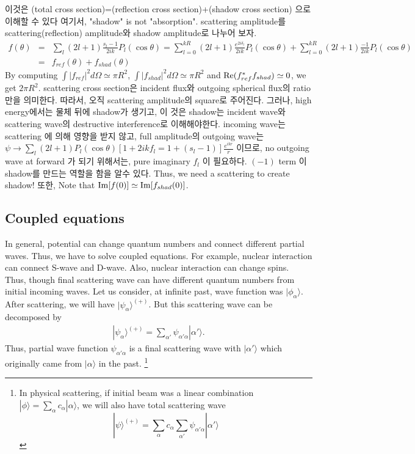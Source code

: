 \documentclass[10pt]{article}
\newcommand{\bea}{\begin{eqnarray}}
\newcommand{\eea}{\end{eqnarray}}
\newcommand{\no}{\nonumber \\}
\def\ra{\rangle}
\begin{document}
이것은 
(total cross section)=(reflection cross section)+(shadow cross section)
으로 이해할 수 있다
여기서, "shadow" is not "absorption". scattering amplitude를
scattering(reflection) amplitude와 shadow amplitude로 나누어 보자.
\bea
f(\theta)&=&\sum_l (2l+1)\frac{s_l-1}{2ik} P_l(\cos\theta)
         =\sum_{l=0}^{kR} (2l+1)\frac{e^{2i\delta_l}}{2ik} P_l(\cos\theta)
         +\sum_{l=0}^{kR} (2l+1)\frac{-1}{2ik} P_l(\cos\theta)\no
         &=&f_{ref}(\theta)+f_{shad}(\theta)   
\eea
By computing $\int |f_{ref}|^2 d\Omega\simeq \pi R^2 $, 
$\int |f_{shad}|^2 d\Omega\simeq \pi R^2 $ and
${\rm Re}(f_{ref}^* f_{shad})\simeq 0$, we get $2\pi R^2$. scattering cross section은 
incident flux와 outgoing spherical flux의 ratio만을 의미한다. 따라서, 오직 scattering amplitude의 
square로 주어진다. 그러나, high energy에서는 물체 뒤에 shadow가 생기고, 
 이 것은 shadow는 incident wave와 scattering wave의 destructive interference로 이해해야한다.
incoming wave는 scattering 에 의해 영향을 받지 않고,
full amplitude의 outgoing wave는 
$\psi\to \sum _l (2l+1) P_l(\cos\theta)[1+2ik f_l=1+(s_l-1) ]\frac{e^{ikr}}{r}$ 이므로, 
no outgoing wave at forward 가 되기 위해서는, pure imaginary $f_l$ 이 필요하다.
$(-1)$ term 이 shadow를 만드는 역할을 함을 알수 있다. 
Thus, we need a scattering 
to create shadow! 또한, Note that ${\rm Im} [f(0)]\simeq {\rm Im} [f_{shad}(0)]$.


\subsection{Coupled equations}
In general, potential can change quantum numbers and 
connect different partial waves. Thus, we have to solve
coupled equations. For example, nuclear interaction
can connect S-wave and D-wave. Also, nuclear interaction can 
change spins. Thus, though final scattering wave
can have different quantum numbers from initial incoming waves. 
Let us consider, at infinite past, wave function was
$|\phi_\alpha\ra$. After scattering, we will have
$|\psi_\alpha\ra^{(+)}$. But this scattering wave can be
decomposed by
\bea
|\psi_\alpha\ra^{(+)}=\sum_{\alpha'}\psi_{\alpha'\alpha}|\alpha'\ra.
\eea 
Thus, partial wave function $\psi_{\alpha'\alpha}$ is a
final scattering wave with $|\alpha'\ra$ which originally 
came from $|\alpha\ra$ in the past.
\footnote{In physical scattering, if initial beam was a
linear combination $|\phi\ra=\sum_{\alpha}c_\alpha |\alpha\ra$,
we will also have total scattering wave
$$|\psi\ra^{(+)}=
\sum_{\alpha} c_\alpha \sum_{\alpha'} \psi_{\alpha'\alpha}|\alpha'\ra$$
}
\end{document}
